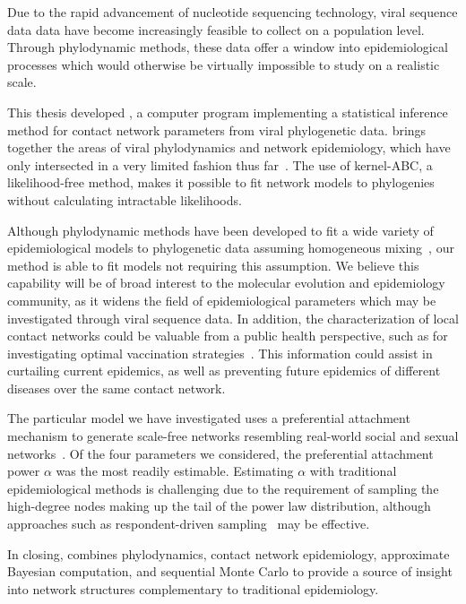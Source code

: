 Due to the rapid advancement of nucleotide sequencing technology, viral
sequence data data have become increasingly feasible to collect on a population
level. Through phylodynamic methods, these data offer a window into
epidemiological processes which would otherwise be virtually impossible to
study on a realistic scale. 

This thesis developed , a computer program implementing a
statistical inference method for contact network parameters from viral
phylogenetic data.  brings together the areas of viral
phylodynamics and network epidemiology, which have only intersected in a very
limited fashion thus far~\autocite{welch2011statistical}. The use of
kernel-\gls{ABC}, a likelihood-free method, makes it possible to fit network
models to phylogenies without calculating intractable likelihoods.

Although phylodynamic methods have been developed to fit a wide variety of
epidemiological models to phylogenetic data assuming homogeneous
mixing~\autocite{volz2012complex, rasmussen2014phylodynamic}, our method is
able to fit models not requiring this assumption. We believe this capability
will be of broad interest to the molecular evolution and epidemiology
community, as it widens the field of epidemiological parameters which may be
investigated through viral sequence data. In addition, the characterization of
local contact networks could be valuable from a public health perspective, such
as for investigating optimal vaccination
strategies~\autocite{keeling2005networks, peng2013vaccination,
ma2013importance, rushmore2014network}. This information could assist in
curtailing current epidemics, as well as preventing future epidemics of
different diseases over the same contact network.

The particular model we have investigated uses a preferential attachment
mechanism to generate scale-free networks resembling real-world social and
sexual networks~\autocite{liljeros2001web, schneeberger2004scale,
colgate1989risk}. Of the four parameters we considered, the preferential
attachment power $\alpha$ was the most readily estimable. Estimating $\alpha$
with traditional epidemiological methods is challenging due to the requirement
of sampling the high-degree nodes making up the tail of the power law
distribution, although approaches such as respondent-driven
sampling~\autocite{heckathorn1997respondent} may be effective.

In closing,  combines phylodynamics, contact network
epidemiology, approximate Bayesian computation, and sequential Monte Carlo 
to provide a source of insight into network structures complementary to
traditional epidemiology.
